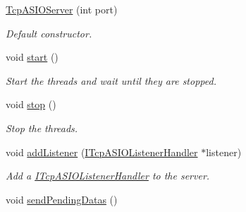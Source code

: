 \begin{DoxyCompactItemize}
\item 
\hyperlink{classmognetwork_1_1_tcp_a_s_i_o_server_a8a201f84e02e478de1de4e0e4d3c029f}{Tcp\-A\-S\-I\-O\-Server} (int port)
\begin{DoxyCompactList}\small\item\em Default constructor. \end{DoxyCompactList}\item 
\hypertarget{classmognetwork_1_1_tcp_a_s_i_o_server_ad6c804597aafd577c41310cdc986c7ff}{void \hyperlink{classmognetwork_1_1_tcp_a_s_i_o_server_ad6c804597aafd577c41310cdc986c7ff}{start} ()}\label{classmognetwork_1_1_tcp_a_s_i_o_server_ad6c804597aafd577c41310cdc986c7ff}

\begin{DoxyCompactList}\small\item\em Start the threads and wait until they are stopped. \end{DoxyCompactList}\item 
\hypertarget{classmognetwork_1_1_tcp_a_s_i_o_server_aa94340baa5fbbfba0f5467c6ddd32b91}{void \hyperlink{classmognetwork_1_1_tcp_a_s_i_o_server_aa94340baa5fbbfba0f5467c6ddd32b91}{stop} ()}\label{classmognetwork_1_1_tcp_a_s_i_o_server_aa94340baa5fbbfba0f5467c6ddd32b91}

\begin{DoxyCompactList}\small\item\em Stop the threads. \end{DoxyCompactList}\item 
void \hyperlink{classmognetwork_1_1_tcp_a_s_i_o_server_ac1feafc63d86a8aa90ef6a78acd7051f}{add\-Listener} (\hyperlink{classmognetwork_1_1_i_tcp_a_s_i_o_listener_handler}{I\-Tcp\-A\-S\-I\-O\-Listener\-Handler} $\ast$listener)
\begin{DoxyCompactList}\small\item\em Add a \hyperlink{classmognetwork_1_1_i_tcp_a_s_i_o_listener_handler}{I\-Tcp\-A\-S\-I\-O\-Listener\-Handler} to the server. \end{DoxyCompactList}\item 
\hypertarget{classmognetwork_1_1_tcp_a_s_i_o_server_a6627fca52b19ead79e8a7134bade9e1f}{void \hyperlink{classmognetwork_1_1_tcp_a_s_i_o_server_a6627fca52b19ead79e8a7134bade9e1f}{send\-Pending\-Datas} ()}\label{classmognetwork_1_1_tcp_a_s_i_o_server_a6627fca52b19ead79e8a7134bade9e1f}


\end{DoxyCompactItemize}
